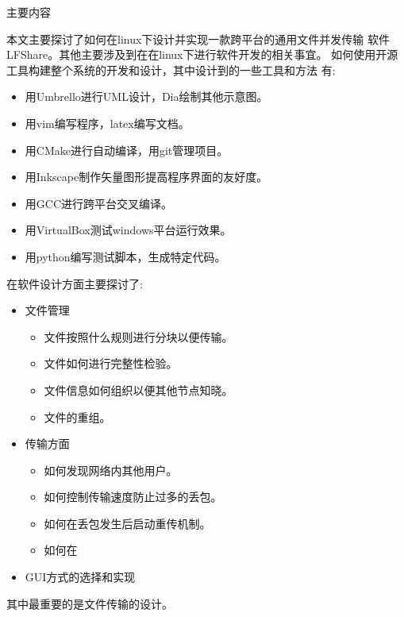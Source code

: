\documentclass{data/hbue}
\begin{document}
\reportcontent
{
\begin{description}
	\item{主要内容}

		本文主要探讨了如何在linux下设计并实现一款跨平台的通用文件并发传输
		软件LFShare。其他主要涉及到在在linux下进行软件开发的相关事宜。
		如何使用开源工具构建整个系统的开发和设计，其中设计到的一些工具和方法
		有:
		\begin{itemize}
			\item 用Umbrello进行UML设计，Dia绘制其他示意图。
			\item 用vim编写程序，latex编写文档。
			\item 用CMake进行自动编译，用git管理项目。
			\item 用Inkscape制作矢量图形提高程序界面的友好度。
			\item 用GCC进行跨平台交叉编译。
			\item 用VirtualBox测试windows平台运行效果。
			\item 用python编写测试脚本，生成特定代码。
		\end{itemize}
		在软件设计方面主要探讨了:
		\begin{itemize}
			\item 文件管理
				\begin{itemize}
					\item 文件按照什么规则进行分块以便传输。
					\item 文件如何进行完整性检验。
					\item 文件信息如何组织以便其他节点知晓。
					\item 文件的重组。
				\end{itemize}
			\item 传输方面
				\begin{itemize}
					\item 如何发现网络内其他用户。
					\item 如何控制传输速度防止过多的丢包。
					\item 如何在丢包发生后启动重传机制。
					\item 如何在
				\end{itemize}
			\item GUI方式的选择和实现
		\end{itemize}
		其中最重要的是文件传输的设计。
\end{description}
}
\end{document}
